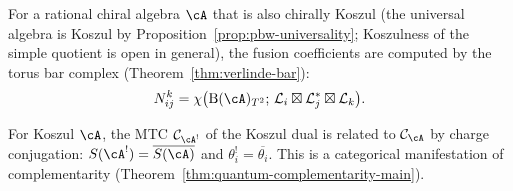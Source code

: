 \begin{remark}\label{rem:bar-complex-mtc}
For a rational chiral algebra $\cA$ that is also chirally
Koszul \textup{(}the universal algebra is Koszul by
Proposition~\textup{\ref{prop:pbw-universality}}; Koszulness of
the simple quotient is open in general\textup{)},
the fusion coefficients are computed by the torus bar complex
(Theorem~\ref{thm:verlinde-bar}):
\begin{equation}\label{eq:bar-verlinde-connection}
N_{ij}^k = \chi\bigl(\mathrm{B}(\cA)_{T^2};\, \mathcal{L}_i \boxtimes \mathcal{L}_j^* \boxtimes \mathcal{L}_k\bigr).
\end{equation}
\end{remark}

\begin{remark}\label{rem:mtc-koszul}
For Koszul $\cA$, the MTC $\mathcal{C}_{\cA^!}$ of the Koszul dual is related to $\mathcal{C}_{\cA}$ by charge conjugation: $S(\cA^!) = \overline{S(\cA)}$ and $\theta_i^! = \overline{\theta_i}$. This is a categorical manifestation of complementarity (Theorem~\ref{thm:quantum-complementarity-main}).
\end{remark}
